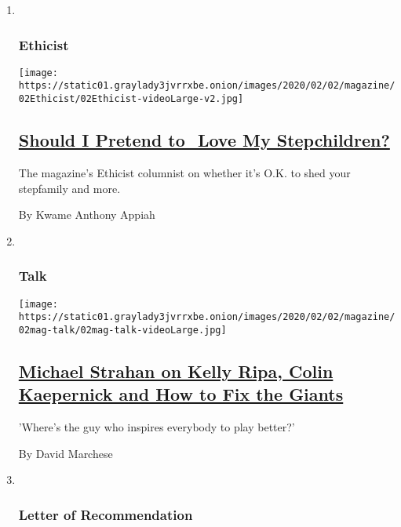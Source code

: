 \begin{enumerate}
\def\labelenumi{\arabic{enumi}.}
\item ~
  \hypertarget{ethicist}{%
  \subsubsection{Ethicist}\label{ethicist}}

  \texttt{[image: https://static01.graylady3jvrrxbe.onion/images/2020/02/02/magazine/02Ethicist/02Ethicist-videoLarge-v2.jpg]}

  \hypertarget{should-i-pretend-to-love-my-stepchildren}{%
  \subsection{\texorpdfstring{\href{/2020/01/28/magazine/should-i-pretend-to-love-my-stepchildren.html}{Should
  I Pretend to  Love My
  Stepchildren?}}{Should I Pretend to  Love My Stepchildren?}}\label{should-i-pretend-to-love-my-stepchildren}}

  The magazine's Ethicist columnist on whether it's O.K. to shed your
  stepfamily and more.

  By Kwame Anthony Appiah
\item ~
  \hypertarget{talk}{%
  \subsubsection{Talk}\label{talk}}

  \texttt{[image: https://static01.graylady3jvrrxbe.onion/images/2020/02/02/magazine/02mag-talk/02mag-talk-videoLarge.jpg]}

  \hypertarget{michael-strahan-on-kelly-ripa-colin-kaepernick-and-how-to-fix-the-giants}{%
  \subsection{\texorpdfstring{\href{/interactive/2020/01/27/magazine/michael-strahan-interview.html}{Michael
  Strahan on Kelly Ripa, Colin Kaepernick and How to Fix the
  Giants}}{Michael Strahan on Kelly Ripa, Colin Kaepernick and How to Fix the Giants}}\label{michael-strahan-on-kelly-ripa-colin-kaepernick-and-how-to-fix-the-giants}}

  'Where's the guy who inspires everybody to play better?'

  By David Marchese
\item ~
  \hypertarget{letter-of-recommendation}{%
  \subsubsection{Letter of
  Recommendation}\label{letter-of-recommendation}}


\end{enumerate}
